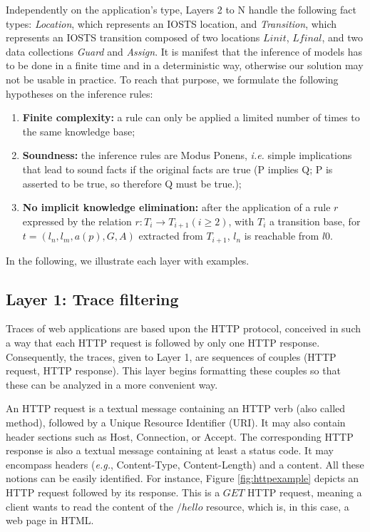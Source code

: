 Independently on the application's type, Layers 2 to N handle the
following fact types: \textit{Location}, which represents an
IOSTS location, and \textit{Transition}, which represents an
IOSTS transition composed of two locations $Linit$, $Lfinal$,
and two data collections \textit{Guard} and \textit{Assign}. It
is manifest that the inference of models has to be done in a
finite time and in a deterministic way, otherwise our solution
may not be usable in practice. To reach that purpose, we
formulate the following hypotheses on the inference rules:

\begin{enumerate}
    \item \textbf{Finite complexity:} a rule can only be applied
        a limited number of times to the same knowledge base;

    \item \textbf{Soundness:} the inference rules are Modus
        Ponens, \emph{i.e.} simple implications that lead to
        sound facts if the original facts are true (P implies Q;
        P is asserted to be true, so therefore Q must be true.);

    \item \textbf{No implicit knowledge elimination:} after the
        application of a rule $r$ expressed by the relation $r:
        T_i \rightarrow T_{i+1} (i\geq 2)$, with $T_i$ a
        transition base, for $t=(l_n,l_m,a(p),G,A)$ extracted
        from $T_{i+1}$, $l_n$ is reachable from $l0$.
\end{enumerate}

In the following, we illustrate each layer with examples.

\subsection{Layer 1: Trace filtering}
\label{sec:modelinf:webapps:L1}

Traces of web applications are based upon the HTTP protocol,
conceived in such a way that each HTTP request is followed by
only one HTTP response. Consequently, the traces, given to Layer
1, are sequences of couples (HTTP request, HTTP response). This
layer begins formatting these couples so that these can be
analyzed in a more convenient way.

An HTTP request is a textual message containing an HTTP verb
(also called method), followed by a Unique Resource Identifier
(URI). It may also contain header sections such as Host,
Connection, or Accept. The corresponding HTTP response is also a
textual message containing at least a status code. It may
encompass headers (\emph{e.g.},  Content-Type, Content-Length) and a
content. All these notions can be easily identified. For
instance, Figure \ref{fig:httpexample} depicts an HTTP request
followed by its response. This is a $GET$ HTTP request, meaning a
client wants to read the content of the $/hello$ resource, which
is, in this case, a web page in HTML.

